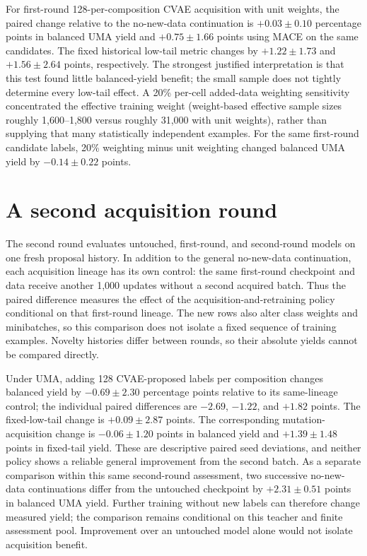 \documentclass[11pt]{article}
\begin{document}
For first-round 128-per-composition CVAE acquisition with unit weights, the paired change relative to the no-new-data continuation is $+0.03\pm0.10$ percentage points in balanced UMA yield and $+0.75\pm1.66$ points using MACE on the same candidates. The fixed historical low-tail metric changes by $+1.22\pm1.73$ and $+1.56\pm2.64$ points, respectively. The strongest justified interpretation is that this test found little balanced-yield benefit; the small sample does not tightly determine every low-tail effect. A 20\% per-cell added-data weighting sensitivity concentrated the effective training weight (weight-based effective sample sizes roughly 1,600--1,800 versus roughly 31,000 with unit weights), rather than supplying that many statistically independent examples. For the same first-round candidate labels, 20\% weighting minus unit weighting changed balanced UMA yield by $-0.14\pm0.22$ points.

\section{A second acquisition round}
The second round evaluates untouched, first-round, and second-round models on one fresh proposal history. In addition to the general no-new-data continuation, each acquisition lineage has its own control: the same first-round checkpoint and data receive another 1,000 updates without a second acquired batch. Thus the paired difference measures the effect of the acquisition-and-retraining policy conditional on that first-round lineage. The new rows also alter class weights and minibatches, so this comparison does not isolate a fixed sequence of training examples. Novelty histories differ between rounds, so their absolute yields cannot be compared directly.

Under UMA, adding 128 CVAE-proposed labels per composition changes balanced yield by $-0.69\pm2.30$ percentage points relative to its same-lineage control; the individual paired differences are $-2.69$, $-1.22$, and $+1.82$ points. The fixed-low-tail change is $+0.09\pm2.87$ points. The corresponding mutation-acquisition change is $-0.06\pm1.20$ points in balanced yield and $+1.39\pm1.48$ points in fixed-tail yield. These are descriptive paired seed deviations, and neither policy shows a reliable general improvement from the second batch. As a separate comparison within this same second-round assessment, two successive no-new-data continuations differ from the untouched checkpoint by $+2.31\pm0.51$ points in balanced UMA yield. Further training without new labels can therefore change measured yield; the comparison remains conditional on this teacher and finite assessment pool. Improvement over an untouched model alone would not isolate acquisition benefit.
\end{document}
